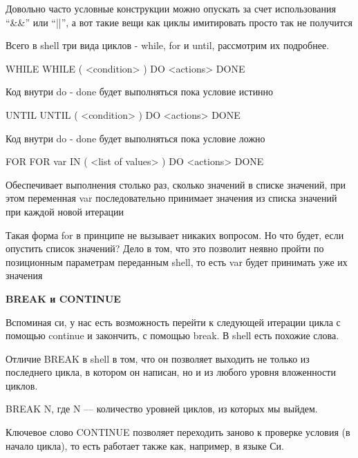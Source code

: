 Довольно часто условные конструкции можно опускать за счет использования “\&\&” или “||”, а вот такие вещи как циклы имитировать просто так не получится

Всего в shell три вида циклов - while, for и until, рассмотрим их подробнее.

\begin{shCode}{WHILE}
	WHILE ( <condition> )
		DO
	 		<actions>
		DONE
\end{shCode}
Код внутри do - done будет выполняться пока условие истинно

\begin{shCode}{UNTIL}
	UNTIL ( <condition> )
		DO
			<actions>
		DONE
\end{shCode}
Код внутри do - done будет выполняться пока условие ложно

\begin{shCode}{FOR}
	FOR var IN ( <list of values> )
		DO
			<actions>
		DONE
\end{shCode}
Обеспечивает выполнения столько раз, сколько значений в списке значений, при этом переменная var последовательно принимает значения из списка значений при каждой новой итерации

Такая форма for в принципе не вызывает никаких вопросом. Но что будет, если опустить список значений? Дело в том, что это позволит неявно пройти по позиционным параметрам переданным shell, то есть var будет принимать уже их значения

\textbf{BREAK и CONTINUE}

Вспоминая си, у нас есть возможность перейти к следующей итерации цикла с помощью continue и закончить, с помощью break. В shell есть похожие слова. 

Отличие BREAK в shell в том, что он  позволяет выходить не только из последнего цикла, в  котором он написан, но и из любого уровня вложенности циклов. 

BREAK N, где N --- количество уровней циклов, из которых мы выйдем.

Ключевое слово CONTINUE позволяет переходить заново к проверке условия (в начало цикла), то есть работает также как, например, в языке Си. 
